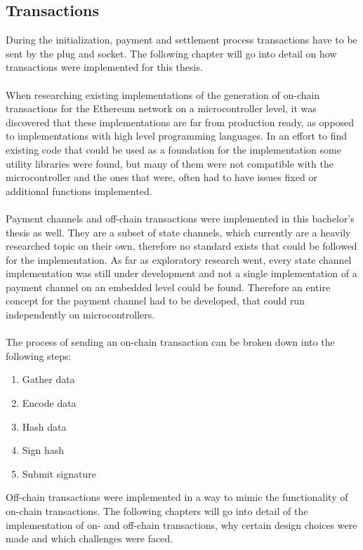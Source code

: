 \subsection{Transactions}
During the initialization, payment and settlement process transactions have to be sent by the plug and socket.
The following chapter will go into detail on how transactions were implemented for this thesis.
\\\\
When researching existing implementations of the generation of on-chain transactions for the Ethereum network on a microcontroller level, it was discovered that these implementations are far from production ready, as opposed to implementations with high level programming languages.
In an effort to find existing code that could be used as a foundation for the implementation some utility libraries were found, but many of them were not compatible with the microcontroller and the ones that were, often had to have issues fixed or additional functions implemented.
\\\\
Payment channels and off-chain transactions were implemented in this bachelor’s thesis as well.
They are a subset of state channels, which currently are a heavily researched topic on their own, therefore no standard exists that could be followed for the implementation.
As far as exploratory research went, every state channel implementation was still under development and not a single implementation of a payment channel on an embedded level could be found\cite{state-channels}.
Therefore an entire concept for the payment channel had to be developed, that could run independently on microcontrollers.
\\\\
The process of sending an on-chain transaction can be broken down into the following steps: 
\begin{enumerate}
    \item Gather data
    \item Encode data
    \item Hash data
    \item Sign hash
    \item Submit signature
\end{enumerate}
Off-chain transactions were implemented in a way to mimic the functionality of on-chain transactions.
The following chapters will go into detail of the implementation of on- and off-chain transactions, why certain design choices were made and which challenges were faced.
